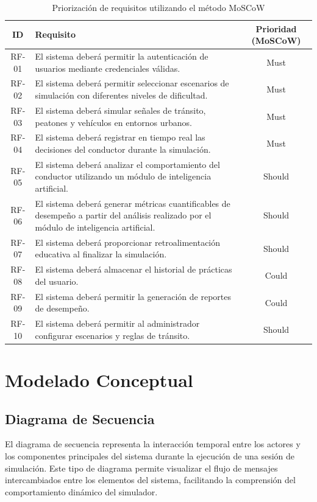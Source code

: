 \documentclass[12pt]{article}
\begin{document}
\begin{table}[H]
\centering
\begin{tabular}{|c|p{8cm}|c|}
\hline
\textbf{ID} & \textbf{Requisito} & \textbf{Prioridad (MoSCoW)} \\
\hline
RF-01 & El sistema deberá permitir la autenticación de usuarios mediante credenciales válidas. & Must \\
\hline
RF-02 & El sistema deberá permitir seleccionar escenarios de simulación con diferentes niveles de dificultad. & Must \\
\hline
RF-03 & El sistema deberá simular señales de tránsito, peatones y vehículos en entornos urbanos. & Must \\
\hline
RF-04 & El sistema deberá registrar en tiempo real las decisiones del conductor durante la simulación. & Must \\
\hline
RF-05 & El sistema deberá analizar el comportamiento del conductor utilizando un módulo de inteligencia artificial. & Should \\
\hline
RF-06 & El sistema deberá generar métricas cuantificables de desempeño a partir del análisis realizado  por el módulo de inteligencia artificial. & Should \\
\hline
RF-07 & El sistema deberá proporcionar retroalimentación educativa al finalizar la simulación. & Should \\
\hline
RF-08 & El sistema deberá almacenar el historial de prácticas del usuario. & Could \\
\hline
RF-09 & El sistema deberá permitir la generación de reportes de desempeño. & Could \\
\hline
RF-10 & El sistema deberá permitir al administrador configurar escenarios y reglas de tránsito. & Should \\
\hline
\end{tabular}
\caption{Priorización de requisitos utilizando el método MoSCoW}
\end{table}
	\section{Modelado Conceptual}
\subsection{Diagrama de Secuencia}

El diagrama de secuencia representa la interacción temporal entre los actores y los componentes principales del sistema durante la ejecución de una sesión de simulación. Este tipo de diagrama permite visualizar el flujo de mensajes intercambiados entre los elementos del sistema, facilitando la comprensión del comportamiento dinámico del simulador.
\end{document}
